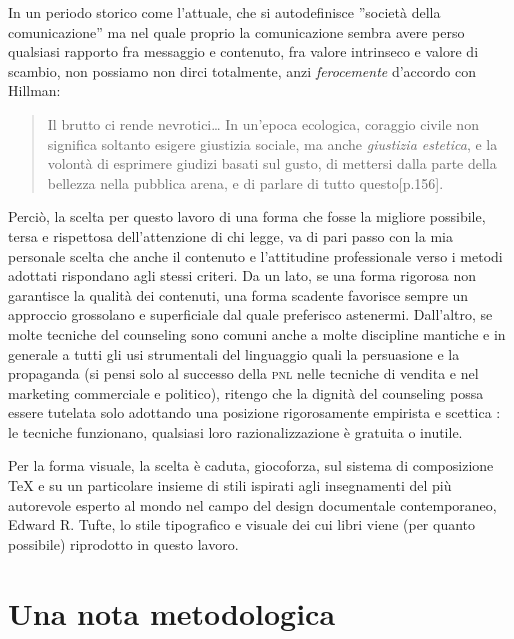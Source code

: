 In un periodo storico come l'attuale, che si autodefinisce ''società della comunicazione'' ma nel quale proprio la comunicazione sembra avere perso qualsiasi rapporto fra messaggio e contenuto, fra valore intrinseco e valore di scambio, non possiamo non dirci totalmente, anzi \emph{ferocemente} d'accordo con Hillman:
\begin{quote}
Il brutto ci rende nevrotici{\ldots} In un'epoca ecologica, coraggio civile non significa soltanto esigere giustizia sociale, ma anche \emph{giustizia estetica}, e la volontà di esprimere giudizi basati sul gusto, di mettersi dalla parte della bellezza nella pubblica arena, e di parlare di tutto questo\cite{100anni}[p.156].
\end{quote}
Perciò, la scelta per questo lavoro di una forma che fosse la migliore possibile, tersa e rispettosa dell'attenzione di chi legge, va di pari passo con la mia personale scelta che anche il contenuto e l'attitudine professionale verso i metodi adottati rispondano agli stessi criteri.
Da un lato, se una forma rigorosa non garantisce la qualità dei contenuti, una forma scadente favorisce sempre un approccio grossolano e superficiale dal quale preferisco astenermi. 
Dall'altro, se molte tecniche del counseling sono comuni anche a molte  discipline mantiche e in generale a tutti gli usi strumentali del linguaggio quali la persuasione e la  propaganda (si pensi solo al successo  della \textsc{pnl}  nelle tecniche di vendita e nel marketing commerciale e politico), ritengo che la dignità del counseling possa essere tutelata solo adottando una posizione rigorosamente empirista e scettica  : le tecniche funzionano, qualsiasi loro razionalizzazione è gratuita o inutile.

Per la forma visuale, la scelta è caduta, giocoforza, sul sistema di composizione {\TeX}\cite{texbook}\cite{Mittelbach2004}  e su un  particolare insieme di stili ispirati agli insegnamenti del più autorevole esperto al mondo nel campo del design documentale contemporaneo, Edward R. Tufte, lo stile tipografico e visuale dei cui libri viene (per quanto possibile) riprodotto in questo lavoro\cite{Tufte1990}.

\section{Una nota metodologica}

